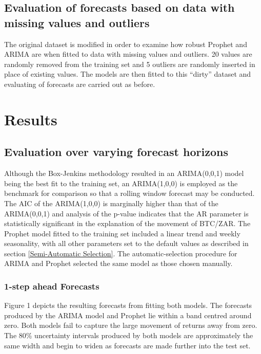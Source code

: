 \documentclass[12pt,a4paper]{article}
\numberwithin{equation}{section}
\numberwithin{figure}{section}
\numberwithin{table}{section}
\begin{document}
\subsection{Evaluation of forecasts based on data with missing values
and
outliers}\label{evaluation-of-forecasts-based-on-data-with-missing-values-and-outliers}

The original dataset is modified in order to examine how robust Prophet
and ARIMA are when fitted to data with missing values and outliers. 20
values are randomly removed from the training set and 5 outliers are
randomly inserted in place of existing values. The models are then
fitted to this ``dirty'' dataset and evaluating of forecasts are carried
out as before.

\section{\texorpdfstring{Results
\label{Results}}{Results }}\label{results}

\subsection{Evaluation over varying forecast
horizons}\label{evaluation-over-varying-forecast-horizons}

Although the Box-Jenkins methodology resulted in an ARIMA(0,0,1) model
being the best fit to the training set, an ARIMA(1,0,0) is employed as
the benchmark for comparison so that a rolling window forecast may be
conducted. The AIC of the ARIMA(1,0,0) is marginally higher than that of
the ARIMA(0,0,1) and analysis of the p-value indicates that the AR
parameter is statistically significant in the explanation of the
movement of BTC/ZAR. The Prophet model fitted to the training set
included a linear trend and weekly seasonality, with all other
parameters set to the default values as described in section
\ref{Semi-Automatic Selection}. The automatic-selection procedure for
ARIMA and Prophet selected the same model as those chosen manually.

\subsubsection{1-step ahead Forecasts}\label{step-ahead-forecasts}

Figure 1 depicts the resulting forecasts from fitting both models. The
forecasts produced by the ARIMA model and Prophet lie within a band
centred around zero. Both models fail to capture the large movement of
returns away from zero. The 80\% uncertainty intervals produced by both
models are approximately the same width and begin to widen as forecasts
are made further into the test set.
\end{document}
